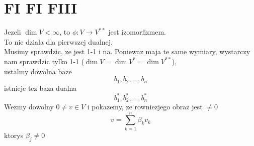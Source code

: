 \documentclass{article}
\begin{document}
\ttfamily
\section*{FI FI FIII}
Jezeli $\dim V < \infty$, to $\phi:V\to V^{**}$ jest izomorfizmem.\medskip\\
To nie dziala dla pierwszej dualnej.\\
\dowod
Musimy sprawdzic, ze jest 1-1 i na. Poniewaz maja te same wymiary, wystarczy nam sprawdzic tylko 1-1 ($\dim V = \dim V^*=\dim V^{**}$),\medskip\\
ustalmy dowolna baze 
$$b_1, b_2, ..., b_n$$
istnieje tez baza dualna
$$b_1^*, b_2^*, ..., b_n^*$$
Wezmy dowolny $0\neq v\in V$ i pokazemy, ze rowniezjego obraz jest $\neq0$
$$v=\sum\limits_{k=1}^n\beta_kv_k$$
ktorys $\beta_j\neq0$
\end{document}
